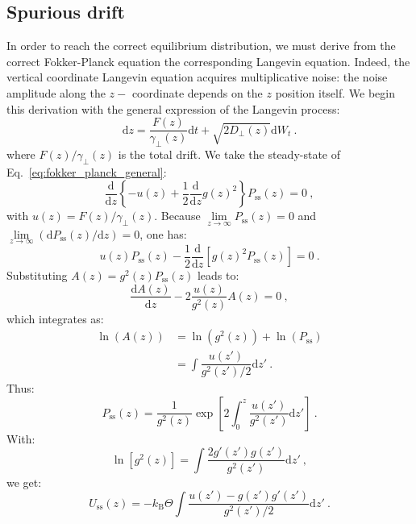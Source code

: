 \subsection{Spurious drift}
In order to reach the correct equilibrium distribution, we must derive from the correct Fokker-Planck equation the corresponding Langevin equation. Indeed, the vertical coordinate Langevin equation acquires multiplicative noise: the noise amplitude along the $z-$ coordinate depends on the $z$ position itself. We begin this derivation with the general expression of the Langevin process:
\begin{equation}
    \mathrm{d}z = \dfrac{F(z)}{\gamma_\perp(z)}\mathrm{d}t + \sqrt{2D_\perp(z)}\mathrm{d}W_t~.
    \label{confinedLangevin_stochdrift}
\end{equation}
where $F(z)/\gamma_\perp(z)$ is the total drift. We take the steady-state of Eq.~\ref{eq:fokker_planck_general}:
\begin{equation}
\dfrac{\mathrm{d}}{\mathrm{d}z} \left\{-u(z) + \dfrac{1}{2} \dfrac{\mathrm{d}}{\mathrm{d}z} g(z)^2 \right\} P_\mathrm{ss}(z) = 0~,
\end{equation}
with $u(z) = F(z)/\gamma_\perp(z)$. Because $\lim\limits_{z\to \infty} P_\mathrm{ss}(z) = 0$ and $\lim\limits_{z\to \infty} (\mathrm{d} P_\mathrm{ss}(z)/\mathrm{d}z) = 0$, one has:
\begin{equation}
u(z) P_\mathrm{ss}(z) - \dfrac{1}{2} \dfrac{\mathrm{d} }{\mathrm{d} z} \left[g(z)^2 P_\mathrm{ss}(z)\right] = 0~.
\end{equation}
Substituting $A(z) = g^2(z)P_\mathrm{ss}(z)$ leads to:
\begin{equation}
    \dfrac{\mathrm{d}A(z)}{\mathrm{d}z} - 2\dfrac{u(z)}{g^2(z)}A(z) = 0~,
\end{equation}
which integrates as:
\begin{align}
    \ln \left(A(z)\right) &= \ln \left(g^2(z)\right) + \ln \left(P_\mathrm{ss}\right)\\
    &= \int \dfrac{u(z')}{g^2(z')/2} \mathrm{d}z'~.
\end{align}
Thus:
\begin{equation}
    P_\mathrm{ss}(z) = \dfrac{1}{g^2(z)} \exp\left[ 2 \int_0^z \dfrac{u(z')}{g^2(z')} \mathrm{d}z' \right]~.
\end{equation}
With:
\begin{equation}
\ln \left[g^2(z)\right] = \int \dfrac{2g'(z')g(z')}{g^2(z')}\mathrm{d}z'~,
\end{equation}
we get:
\begin{equation}
    U_\mathrm{ss}(z) = -k_\mathrm{B}\Theta \int\dfrac{u(z') - g(z')g'(z')}{g^2(z')/2} \mathrm{d}z'~.
\end{equation}

